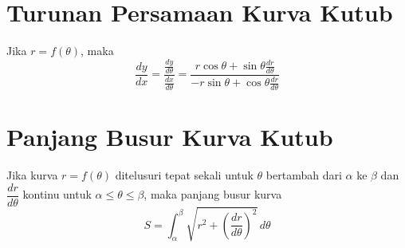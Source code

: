 \documentclass{article}
\begin{document}
\section{Turunan Persamaan Kurva Kutub}
Jika $r=f(\theta)$, maka 
$$ \dfrac{dy}{dx} = \dfrac{\frac{dy}{d\theta}}{\frac{dx}{d\theta}} = \dfrac{r\cos\theta +\sin\theta \frac{dr}{d\theta}}{-r\sin\theta+\cos\theta \frac{dr}{d\theta}} $$
\section{Panjang Busur Kurva Kutub}
Jika kurva $r=f(\theta)$ ditelusuri tepat sekali untuk $\theta$ bertambah dari $\alpha$ ke $\beta$ dan $\dfrac{dr}{d\theta}$ kontinu untuk $\alpha\leq \theta\leq \beta$, maka panjang busur kurva
$$ S=\int_\alpha^\beta \sqrt{r^2+\left(\dfrac{dr}{d\theta}\right)^2}\, d\theta $$
\end{document}
